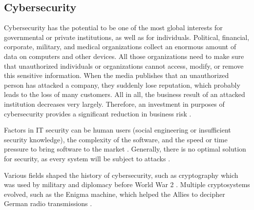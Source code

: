 \subsection{Cybersecurity}
\label{subsec:02_cybersecurity}

Cybersecurity has the potential to be one of the most global interests for governmental or private institutions, as well as for individuals. Political, financial, corporate, military, and medical organizations collect an enormous amount of data on computers and other devices. All those organizations need to make sure that unauthorized individuals or organizations cannot access, modify, or remove this sensitive information. When the media publishes that an unauthorized person has attacked a company, they suddenly lose reputation, which probably leads to the loss of many customers. All in all, the business result of an attacked institution decreases very largely. Therefore, an investment in purposes of cybersecurity provides a significant reduction in business risk \cite{Bishop2003}.

Factors in IT security can be human users (social engineering or insufficient security knowledge), the complexity of the software, and the speed or time pressure to bring software to the market \cite{Bishop2003}. Generally, there is no optimal solution for security, as every system will be subject to attacks \cite{Bishop2003}.

Various fields shaped the history of cybersecurity, such as cryptography which was used by military and diplomacy before World War 2 \cite{Bishop2003}. Multiple cryptosystems evolved, such as the Enigma machine, which helped the Allies to decipher German radio transmissions \cite{Kahn1991}.

